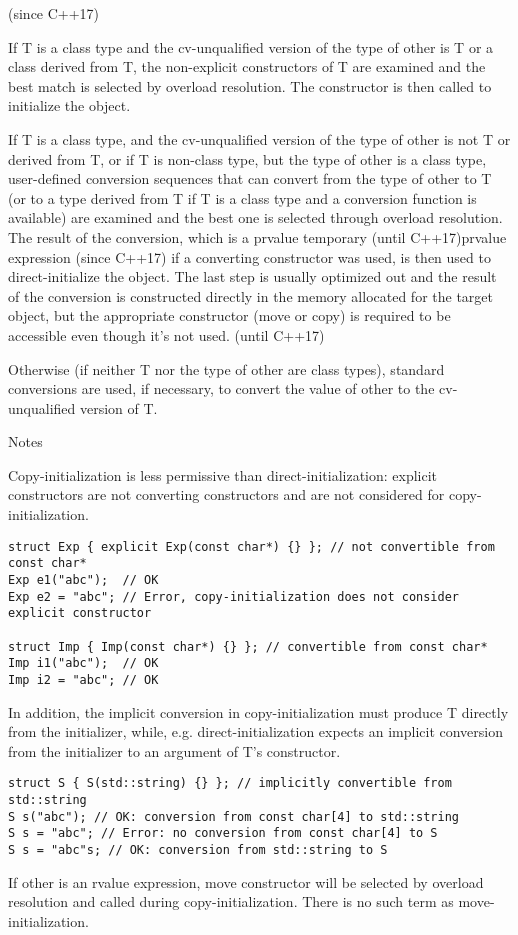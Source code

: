 \documentclass{book}
\begin{document}
	(since C++17)

    If T is a class type and the cv-unqualified version of the type of other is T or a class derived from T,
    the non-explicit constructors of T are examined and the best match is selected by overload resolution. The constructor is then called to initialize the object. 

    If T is a class type, and the cv-unqualified version of the type of other is not T or derived from T, or if T is non-class type,
    but the type of other is a class type, user-defined conversion sequences that can convert from the type of other to
    T (or to a type derived from T if T is a class type and a conversion function is available) are examined and the best one is selected through overload resolution.
    The result of the conversion, which is a prvalue temporary (until C++17)prvalue expression (since C++17) if a converting constructor was used, is then used to direct-initialize the object.
    The last step is usually optimized out and the result of the conversion is constructed directly in the memory allocated for the target object,
    but the appropriate constructor (move or copy) is required to be accessible even though it's not used. (until C++17) 

    Otherwise (if neither T nor the type of other are class types), standard conversions are used, if necessary, to convert the value of other to the cv-unqualified version of T. 

Notes

Copy-initialization is less permissive than direct-initialization: explicit constructors are not converting constructors and are not considered for copy-initialization.

\begin{lstlisting}
struct Exp { explicit Exp(const char*) {} }; // not convertible from const char*
Exp e1("abc");  // OK
Exp e2 = "abc"; // Error, copy-initialization does not consider explicit constructor
 
struct Imp { Imp(const char*) {} }; // convertible from const char*
Imp i1("abc");  // OK
Imp i2 = "abc"; // OK
\end{lstlisting}
In addition, the implicit conversion in copy-initialization must produce T directly from the initializer,
while, e.g. direct-initialization expects an implicit conversion from the initializer to an argument of T's constructor.

\begin{lstlisting}
struct S { S(std::string) {} }; // implicitly convertible from std::string
S s("abc"); // OK: conversion from const char[4] to std::string
S s = "abc"; // Error: no conversion from const char[4] to S
S s = "abc"s; // OK: conversion from std::string to S
\end{lstlisting}
If other is an rvalue expression, move constructor will be selected by overload resolution and called during copy-initialization. There is no such term as move-initialization.
\end{document}
